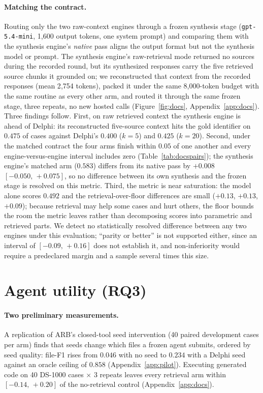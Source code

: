 \documentclass{article}
\newcommand{\ci}[2]{{\footnotesize$[#1,\,#2]$}}
\newcommand{\system}{Delphi}
\begin{document}
\paragraph{Matching the contract.} Routing only the two raw-context engines through a frozen synthesis stage (\texttt{gpt-5.4-mini}, 1{,}600 output tokens, one system prompt) and comparing them with the synthesis engine's \emph{native} pass aligns the output format but not the synthesis model or prompt. The synthesis engine's raw-retrieval mode returned no sources during the recorded round, but its synthesized responses carry the five retrieved source chunks it grounded on; we reconstructed that context from the recorded responses (mean 2{,}754 tokens), packed it under the same 8{,}000-token budget with the same routine as every other arm, and routed it through the same frozen stage, three repeats, no new hosted calls (Figure~\ref{fig:docs}, Appendix~\ref{app:docs}). Three findings follow. First, on raw retrieved context the synthesis engine is ahead of \system{}: its reconstructed five-source context hits the gold identifier on $0.475$ of cases against \system{}'s $0.400$ ($k{=}5$) and $0.425$ ($k{=}20$). Second, under the matched contract the four arms finish within $0.05$ of one another and every engine-versus-engine interval includes zero (Table~\ref{tab:docspairs}); the synthesis engine's matched arm ($0.583$) differs from its native pass by $+0.008$ \ci{-0.050}{+0.075}, so no difference between its own synthesis and the frozen stage is resolved on this metric. Third, the metric is near saturation: the model alone scores $0.492$ and the retrieval-over-floor differences are small ($+0.13$, $+0.13$, $+0.09$); because retrieval may help some cases and hurt others, the floor bounds the room the metric leaves rather than decomposing scores into parametric and retrieved parts. We detect no statistically resolved difference between any two engines under this evaluation; ``parity or better'' is not supported either, since an interval of \ci{-0.09}{+0.16} does not establish it, and non-inferiority would require a predeclared margin and a sample several times this size.

\section{Agent utility (RQ3)}
\label{sec:utility}

\paragraph{Two preliminary measurements.} A replication of ARB's closed-tool seed intervention (40 paired development cases per arm) finds that seeds change which files a frozen agent submits, ordered by seed quality: file-F1 rises from $0.046$ with no seed to $0.234$ with a \system{} seed against an oracle ceiling of $0.858$ (Appendix~\ref{app:pilot}). Executing generated code on 40 DS-1000 cases $\times$ 3 repeats leaves every retrieval arm within \ci{-0.14}{+0.20} of the no-retrieval control (Appendix~\ref{app:docs}).
\end{document}
